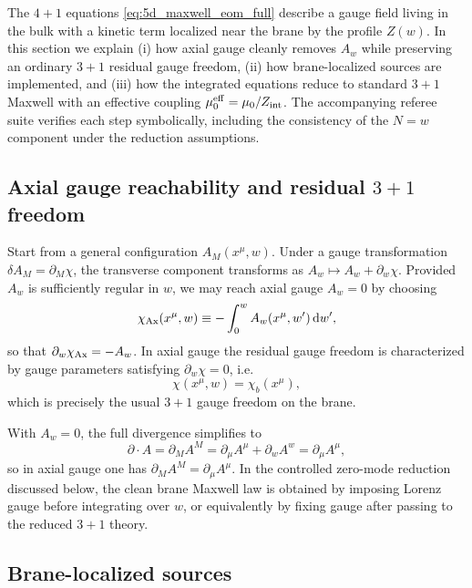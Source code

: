 \documentclass[11pt]{article}
\newcommand{\dd}{\mathrm d}
\newcommand{\A}{A}
\newcommand{\Z}{Z}
\newcommand{\Zint}{Z_{\rm int}} %
\newcommand{\muo}{\mu_0}
\newcommand{\mueff}{\mu_0^{\rm eff}}
\begin{document}
The \(4+1\) equations \cref{eq:5d_maxwell_eom_full} describe a gauge field living
in the bulk with a kinetic term localized near the brane by the profile \(\Z(w)\).
In this section we explain (i) how axial gauge cleanly removes \(\A_w\) while
preserving an ordinary \(3+1\) residual gauge freedom, (ii) how brane-localized
sources are implemented, and (iii) how the integrated equations reduce to
standard \(3+1\) Maxwell with an effective coupling
\(\mueff=\muo/\Zint\). The accompanying referee suite verifies each step
symbolically, including the consistency of the \(N=w\) component under the
reduction assumptions.

\subsection{\texorpdfstring{Axial gauge reachability and residual \(3+1\) freedom}{Axial gauge reachability and residual 3+1 freedom}}
\label{sec:axial_gauge}

Start from a general configuration \(\A_M(x^\mu,w)\). Under a gauge transformation
\(\delta\A_M=\partial_M\chi\), the transverse component transforms as
\(\A_w\mapsto \A_w+\partial_w\chi\). Provided \(\A_w\) is sufficiently regular in
\(w\), we may reach axial gauge \(\A_w=0\) by choosing
\begin{equation}
  \chi_{\rm Ax}(x^\mu,w)
  \equiv -\int_{0}^{w}\A_w(x^\mu,w')\,\dd w',
  \label{eq:chi_axial}
\end{equation}
so that \(\partial_w\chi_{\rm Ax}=-\A_w\). In axial gauge the residual gauge
freedom is characterized by gauge parameters satisfying \(\partial_w\chi=0\), i.e.
\begin{equation}
  \chi(x^\mu,w)=\chi_b(x^\mu),
\end{equation}
which is precisely the usual \(3+1\) gauge freedom on the brane.

With \(\A_w=0\), the full divergence simplifies to
\begin{equation}
  \partial\!\cdot\!\A
  = \partial_M \A^M
  = \partial_\mu \A^\mu + \partial_w \A^w
  = \partial_\mu \A^\mu,
\end{equation}
so in axial gauge one has \(\partial_M \A^M=\partial_\mu \A^\mu\). In the
controlled zero-mode reduction discussed below, the clean brane Maxwell law is
obtained by imposing Lorenz gauge before integrating over \(w\), or equivalently
by fixing gauge after passing to the reduced \(3+1\) theory.

\subsection{Brane-localized sources}
\label{sec:brane_sources}
\end{document}
